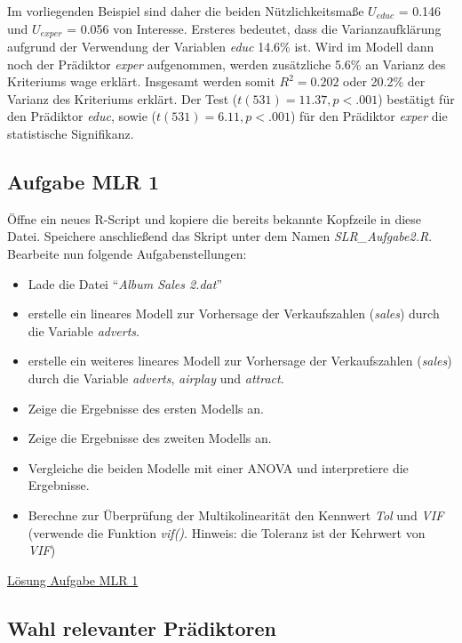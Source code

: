 \documentclass[]{article}
\providecommand{\tightlist}{%
  \setlength{\itemsep}{0pt}\setlength{\parskip}{0pt}}
\begin{document}
Im vorliegenden Beispiel sind daher die beiden Nützlichkeitsmaße
\(U_{educ}\) = 0.146 und \(U_{exper}\) = 0.056 von Interesse. Ersteres
bedeutet, dass die Varianzaufklärung aufgrund der Verwendung der
Variablen \emph{educ} 14.6\% ist. Wird im Modell dann noch der Prädiktor
\emph{exper} aufgenommen, werden zusätzliche 5.6\% an Varianz des
Kriteriums wage erklärt. Insgesamt werden somit \(R^2 = 0.202\) oder
20.2\% der Varianz des Kriteriums erklärt. Der Test
(\(t(531) = 11.37, p< .001\)) bestätigt für den Prädiktor \emph{educ},
sowie (\(t(531) = 6.11, p<.001\)) für den Prädiktor \emph{exper} die
statistische Signifikanz.

\hypertarget{aufgabe-mlr-1}{\subsection*{Aufgabe MLR
1}\label{aufgabe-mlr-1}}

Öffne ein neues R-Script und kopiere die bereits bekannte Kopfzeile in
diese Datei. Speichere anschließend das Skript unter dem Namen
\emph{SLR\_Aufgabe2.R}. Bearbeite nun folgende Aufgabenstellungen:

\begin{itemize}
\tightlist
\item
  Lade die Datei ``\emph{Album Sales 2.dat}''
\item
  erstelle ein lineares Modell zur Vorhersage der Verkaufszahlen
  (\emph{sales}) durch die Variable \emph{adverts}.
\item
  erstelle ein weiteres lineares Modell zur Vorhersage der
  Verkaufszahlen (\emph{sales}) durch die Variable \emph{adverts},
  \emph{airplay} und \emph{attract}.
\item
  Zeige die Ergebnisse des ersten Modells an.
\item
  Zeige die Ergebnisse des zweiten Modells an.
\item
  Vergleiche die beiden Modelle mit einer ANOVA und interpretiere die
  Ergebnisse.
\item
  Berechne zur Überprüfung der Multikolinearität den Kennwert \emph{Tol}
  und \emph{VIF} (verwende die Funktion \emph{vif()}. Hinweis: die
  Toleranz ist der Kehrwert von \emph{VIF})
\end{itemize}

\protect\hyperlink{aufgabe-mlr-1-lsg}{Lösung Aufgabe MLR 1}

\subsection*{Wahl relevanter
Prädiktoren}\label{wahl-relevanter-pradiktoren}
\end{document}
